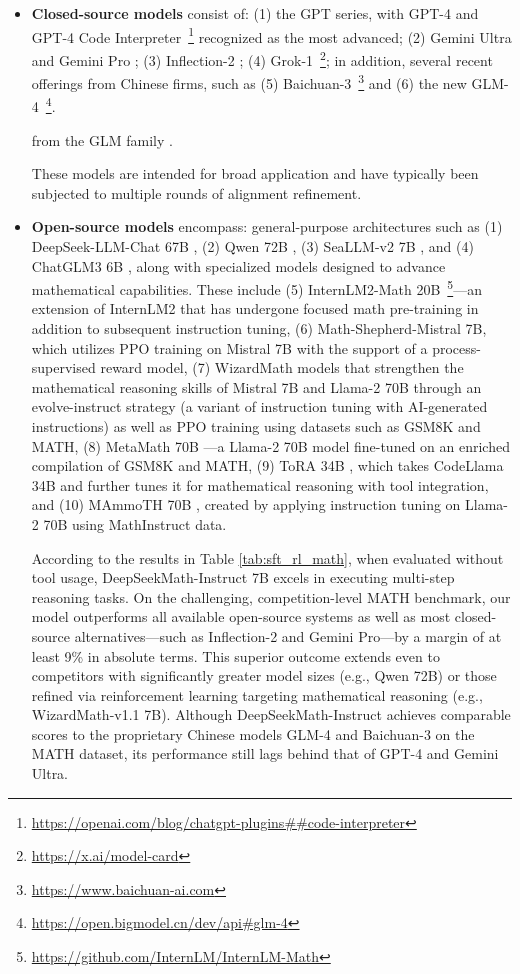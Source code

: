 \begin{itemize}[topsep=0pt]
\begin{itemize}[topsep=0pt]
    \item \textbf{Closed-source models} consist of: (1) the GPT series, with GPT-4 \citep{gpt4} and GPT-4 Code Interpreter~\footnote{\url{https://openai.com/blog/chatgpt-plugins\#\#code-interpreter}} recognized as the most advanced; (2) Gemini Ultra and Gemini Pro \citep{gemini}; (3) Inflection-2 \citep{inflection-2}; (4) Grok-1~\footnote{\url{https://x.ai/model-card}}; in addition, several recent offerings from Chinese firms, such as (5) Baichuan-3~\footnote{\url{https://www.baichuan-ai.com}} and (6) the new GLM-4~\footnote{\url{https://open.bigmodel.cn/dev/api\#glm-4}}.

    from the GLM family \citep{glm}.

These models are intended for broad application and have typically been subjected to multiple rounds of alignment refinement.
\item \textbf{Open-source models} encompass: general-purpose architectures such as (1) DeepSeek-LLM-Chat 67B \citep{deepseek-llm}, (2) Qwen 72B \citep{qwen}, (3) SeaLLM-v2 7B \citep{seallm}, and (4) ChatGLM3 6B \citep{chatglm3}, along with specialized models designed to advance mathematical capabilities. These include (5) InternLM2-Math 20B~\footnote{\url{https://github.com/InternLM/InternLM-Math}}—an extension of InternLM2 that has undergone focused math pre-training in addition to subsequent instruction tuning, (6) Math-Shepherd-Mistral 7B, which utilizes PPO training \citep{schulman2017proximal} on Mistral 7B \citep{mistral} with the support of a process-supervised reward model, (7) WizardMath models \citep{wizardmath} that strengthen the mathematical reasoning skills of Mistral 7B and Llama-2 70B \citep{llama2} through an evolve-instruct strategy (a variant of instruction tuning with AI-generated instructions) as well as PPO training using datasets such as GSM8K and MATH, (8) MetaMath 70B \citep{metamath}—a Llama-2 70B model fine-tuned on an enriched compilation of GSM8K and MATH, (9) ToRA 34B \cite{tora}, which takes CodeLlama 34B and further tunes it for mathematical reasoning with tool integration, and (10) MAmmoTH 70B \citep{MathInstruct}, created by applying instruction tuning on Llama-2 70B using MathInstruct data.

According to the results in Table \ref{tab:sft_rl_math}, when evaluated without tool usage, DeepSeekMath-Instruct 7B excels in executing multi-step reasoning tasks. On the challenging, competition-level MATH benchmark, our model outperforms all available open-source systems as well as most closed-source alternatives—such as Inflection-2 and Gemini Pro—by a margin of at least 9\% in absolute terms. This superior outcome extends even to competitors with significantly greater model sizes (e.g., Qwen 72B) or those refined via reinforcement learning targeting mathematical reasoning (e.g., WizardMath-v1.1 7B). Although DeepSeekMath-Instruct achieves comparable scores to the proprietary Chinese models GLM-4 and Baichuan-3 on the MATH dataset, its performance still lags behind that of GPT-4 and Gemini Ultra.


\end{itemize}
\end{itemize}
